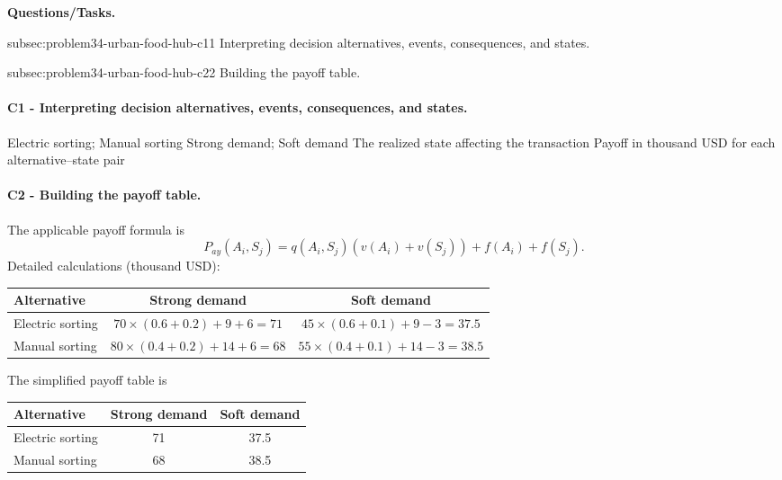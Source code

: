 	\textbf{Questions/Tasks.}
	\begin{enumerate}
	\CriterionTask
	{subsec:problem34-urban-food-hub-c1}{1}
	{Interpreting decision alternatives, events, consequences, and states.}

	\CriterionTask
	{subsec:problem34-urban-food-hub-c2}{2}
	{Building the payoff table.}
	\end{enumerate}

	\paragraph*{C1 - Interpreting decision alternatives, events, consequences, and states.}
	\label{subsec:problem34-urban-food-hub-c1}
	\DecisionElementsTable
	{Electric sorting; Manual sorting}
	{Strong demand; Soft demand}
	{The realized state affecting the transaction}
	{Payoff in thousand USD for each alternative--state pair}

	\paragraph*{C2 - Building the payoff table.}
	\label{subsec:problem34-urban-food-hub-c2}
	The applicable payoff formula is
	\[ P_{ay}(A_i,S_j)=q(A_i,S_j)\left(v(A_i)+v(S_j)\right)+f(A_i)+f(S_j). \]
	Detailed calculations (thousand USD):
	\begin{center}\small
	\begin{tabular}{lcc}
	\toprule
	Alternative & Strong demand & Soft demand \\
	\midrule
	Electric sorting & $70\times(0.6+0.2)+9+6=71$ & $45\times(0.6+0.1)+9-3=37.5$ \\
Manual sorting & $80\times(0.4+0.2)+14+6=68$ & $55\times(0.4+0.1)+14-3=38.5$ \\
	\bottomrule
	\end{tabular}
	\end{center}
	The simplified payoff table is
	\begin{center}
	\begin{tabular}{lcc}
	\toprule
	Alternative & Strong demand & Soft demand \\
	\midrule
	Electric sorting & 71 & 37.5 \\
Manual sorting & 68 & 38.5 \\
	\bottomrule
	\end{tabular}
	\end{center}

